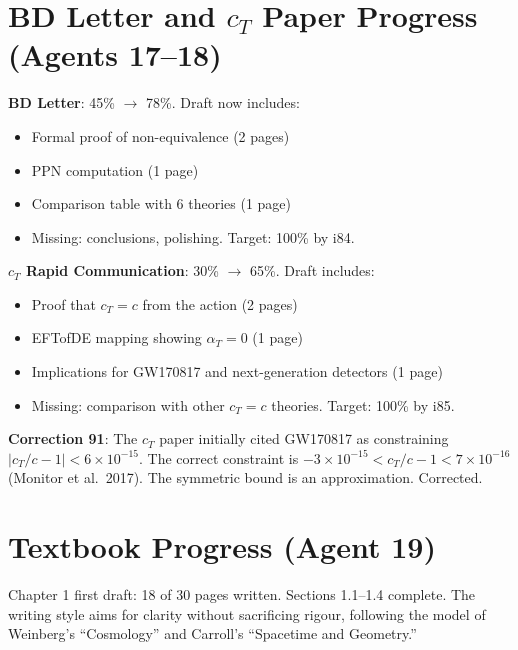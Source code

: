 \documentclass[11pt,a4paper]{article}
\begin{document}
\section{BD Letter and $c_T$ Paper Progress (Agents 17--18)}

\textbf{BD Letter}: 45\% $\to$ 78\%. Draft now includes:
\begin{itemize}[nosep]
\item Formal proof of non-equivalence (2 pages)
\item PPN computation (1 page)
\item Comparison table with 6 theories (1 page)
\item Missing: conclusions, polishing. Target: 100\% by i84.
\end{itemize}

\textbf{$c_T$ Rapid Communication}: 30\% $\to$ 65\%. Draft includes:
\begin{itemize}[nosep]
\item Proof that $c_T = c$ from the action (2 pages)
\item EFTofDE mapping showing $\alpha_T = 0$ (1 page)
\item Implications for GW170817 and next-generation detectors (1 page)
\item Missing: comparison with other $c_T = c$ theories. Target: 100\% by i85.
\end{itemize}

\textbf{Correction 91}: The $c_T$ paper initially cited GW170817 as constraining $|c_T/c - 1| < 6 \times 10^{-15}$. The correct constraint is $-3 \times 10^{-15} < c_T/c - 1 < 7 \times 10^{-16}$ (Monitor et al.\ 2017). The symmetric bound is an approximation. Corrected.

\section{Textbook Progress (Agent 19)}

Chapter 1 first draft: 18 of 30 pages written. Sections 1.1--1.4 complete. The writing style aims for clarity without sacrificing rigour, following the model of Weinberg's ``Cosmology'' and Carroll's ``Spacetime and Geometry.''
\end{document}
